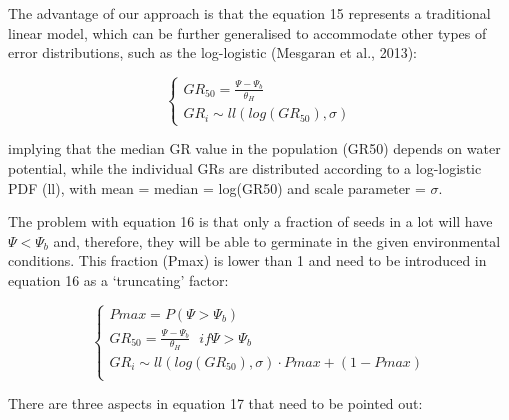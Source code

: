 \documentclass[a4paper,12pt]{article}
\begin{document}
The advantage of our approach is that the equation 15 represents a
traditional linear model, which can be further generalised to
accommodate other types of error distributions, such as the log-logistic
(Mesgaran et al., 2013):

\begin{equation}
\left\{ {\begin{array}{*{20}{l}}
  GR_{50} = \frac{\Psi - \Psi_b}{\theta_H}\\
  GR_i \sim ll(log(GR_{50}), \sigma)
\end{array}} \right.
\end{equation}

implying that the median GR value in the population (GR50) depends on
water potential, while the individual GRs are distributed according to a
log-logistic PDF (ll), with mean = median = log(GR50) and scale
parameter = \(\sigma\).

The problem with equation 16 is that only a fraction of seeds in a lot
will have \(\Psi < \Psi_b\) and, therefore, they will be able to
germinate in the given environmental conditions. This fraction (Pmax) is
lower than 1 and need to be introduced in equation 16 as a `truncating'
factor:

\begin{equation}
\left\{ {\begin{array}{*{20}{l}}
  Pmax = P(\Psi > \Psi_b) \\
  GR_{50} = \frac{\Psi - \Psi_b}{\theta_H} \,\,\,\, if \Psi > \Psi_b \\
  GR_i \sim ll(log(GR_{50}), \sigma) \cdot Pmax + (1 - Pmax) \\
\end{array}} \right.
\end{equation}

There are three aspects in equation 17 that need to be pointed out:
\end{document}
